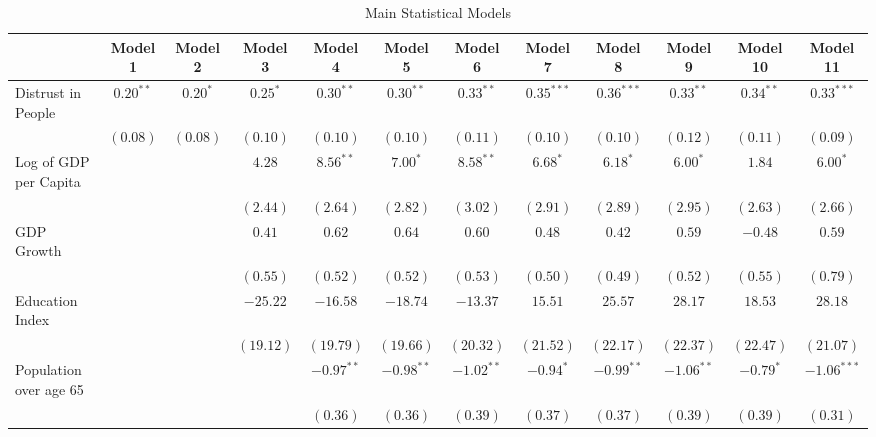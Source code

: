 \documentclass[
  12pt,
]{article}
\begin{document}
\begin{table}
\caption{Main Statistical Models}
\begin{center}
\begin{footnotesize}
\begin{tabular}{l c c c c c c c c c c c}
\hline
 & Model 1 & Model 2 & Model 3 & Model 4 & Model 5 & Model 6 & Model 7 & Model 8 & Model 9 & Model 10 & Model 11 \\
\hline
Distrust in People           & $0.20^{**}$ & $0.20^{*}$ & $0.25^{*}$ & $0.30^{**}$  & $0.30^{**}$  & $0.33^{**}$  & $0.35^{***}$ & $0.36^{***}$ & $0.33^{**}$  & $0.34^{**}$ & $0.33^{***}$  \\
                             & $(0.08)$    & $(0.08)$   & $(0.10)$   & $(0.10)$     & $(0.10)$     & $(0.11)$     & $(0.10)$     & $(0.10)$     & $(0.12)$     & $(0.11)$    & $(0.09)$      \\
Log of GDP per Capita        &             &            & $4.28$     & $8.56^{**}$  & $7.00^{*}$   & $8.58^{**}$  & $6.68^{*}$   & $6.18^{*}$   & $6.00^{*}$   & $1.84$      & $6.00^{*}$    \\
                             &             &            & $(2.44)$   & $(2.64)$     & $(2.82)$     & $(3.02)$     & $(2.91)$     & $(2.89)$     & $(2.95)$     & $(2.63)$    & $(2.66)$      \\
GDP Growth                   &             &            & $0.41$     & $0.62$       & $0.64$       & $0.60$       & $0.48$       & $0.42$       & $0.59$       & $-0.48$     & $0.59$        \\
                             &             &            & $(0.55)$   & $(0.52)$     & $(0.52)$     & $(0.53)$     & $(0.50)$     & $(0.49)$     & $(0.52)$     & $(0.55)$    & $(0.79)$      \\
Education Index              &             &            & $-25.22$   & $-16.58$     & $-18.74$     & $-13.37$     & $15.51$      & $25.57$      & $28.17$      & $18.53$     & $28.18$       \\
                             &             &            & $(19.12)$  & $(19.79)$    & $(19.66)$    & $(20.32)$    & $(21.52)$    & $(22.17)$    & $(22.37)$    & $(22.47)$   & $(21.07)$     \\
Population over age 65       &             &            &            & $-0.97^{**}$ & $-0.98^{**}$ & $-1.02^{**}$ & $-0.94^{*}$  & $-0.99^{**}$ & $-1.06^{**}$ & $-0.79^{*}$ & $-1.06^{***}$ \\
                             &             &            &            & $(0.36)$     & $(0.36)$     & $(0.39)$     & $(0.37)$     & $(0.37)$     & $(0.39)$     & $(0.39)$    & $(0.31)$      \\

\end{tabular}
\end{footnotesize}
\end{center}
\end{table}
\end{document}
